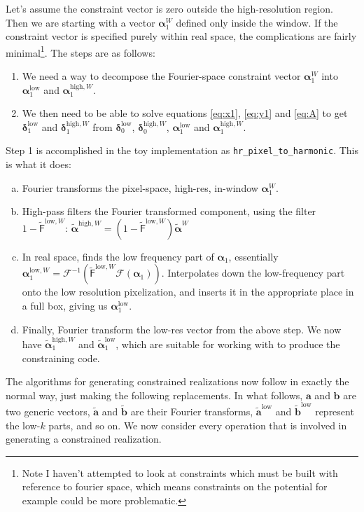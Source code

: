 \documentclass[11pt,a4paper,preprint]{aastex}
\newcommand{\low}{\mathrm{low}}
\newcommand{\high}{\mathrm{high}}
\newcommand{\bmath}[1]{\ensuremath{\bm{#1}}}
\renewcommand{\vec}[1]{\bmath{#1}}
\begin{document}
Let's assume the constraint vector is zero outside the high-resolution region.
Then we are starting with a vector $\vec{\alpha}_1^W$ defined only inside the window.
If the constraint vector is specified purely within real space, the complications
are fairly minimal\footnote{Note I haven't attempted to look at constraints which must
be built with reference to fourier space, which means constraints on the potential for
example could be more problematic.}. The steps are as follows:
\begin{enumerate}
    \item We need a way to decompose the Fourier-space constraint vector
 $\vec{\alpha}_1^W$ into $\vec{\alpha}_1^{\low}$ and $\vec{\alpha}_1^{\high,W}$.
    \item We then need to be able
to solve equations \ref{eq:x1}, \ref{eq:y1} and \ref{eq:A} to get $\vec{\delta}_1^{\low}$ and
$\vec{\delta}_1^{\high,W}$ from $\vec{\delta}_0^{\low}$,
$\vec{\delta}_0^{\high,W}$, $\vec{\alpha}_1^{\low}$ and
$\vec{\alpha}_1^{\high,W}$.
\end{enumerate}
Step 1 is accomplished in the toy implementation as {\tt hr\_pixel\_to\_harmonic}.
This is what it does:
\begin{enumerate}[(a)]
    \item Fourier transforms the pixel-space, high-res, in-window $\vec{\alpha}^W_1$.
    \item High-pass filters the Fourier transformed component, using the filter $1-\tilde{\mathsf{F}}^{\low,W}$:
      $\tilde{\vec{\alpha}}^{\high,W} = (1-\tilde{\mathsf{F}}^{\low,W}) \tilde{\vec{\alpha}}^W$
    \item In real space, finds the low frequency part of $\vec{\alpha}_1$, essentially
      $\vec{\alpha}_1^{\low,W} = \mathcal{F}^{-1}(\tilde{\mathsf{F}}^{\low,W}\mathcal{F}(\vec{\alpha}_1))$.
    Interpolates down the low-frequency part onto the low resolution pixelization,
        and inserts it in the appropriate place in a full box, giving us
        $\vec{\alpha}_1^{\low}$.

    \item Finally, Fourier transform the low-res vector from the above step.
     We now have $\tilde{\vec{\alpha}}_1^{\high,W}$ and
        $\tilde{\vec{\alpha}}_1^{\low}$, which are suitable for working with to produce
        the constraining code.
\end{enumerate}

The algorithms for generating constrained realizations now follow in exactly the normal way, just
making the following replacements. In what follows, $\vec{a}$ and $\vec{b}$ are two generic
vectors, $\tilde{\vec{a}}$ and $\tilde{\vec{b}}$ are their Fourier transforms,
$\tilde{\vec{a}}^{\low}$ and $\tilde{\vec{b}}^{\low}$ represent the low-$k$ parts, and so on. We now
consider every operation that is involved in generating a constrained realization.
\end{document}
